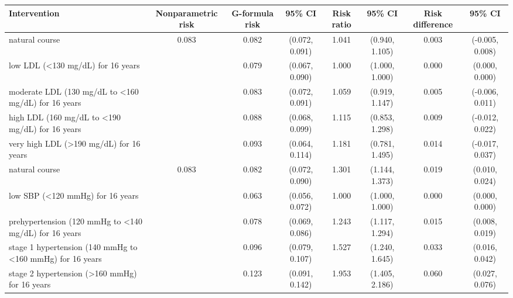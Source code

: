 
\begin{tabular}{lccccccc}
\toprule
Intervention & Nonparametric risk & G-formula risk & 95\% CI & Risk ratio & 95\% CI & Risk difference & 95\% CI\\
\midrule
natural course & 0.083 & 0.082 & (0.072, 0.091) & 1.041 & (0.940, 1.105) & 0.003 & (-0.005, 0.008)\\
low LDL (<130 mg/dL) for 16 years &  & 0.079 & (0.067, 0.090) & 1.000 & (1.000, 1.000) & 0.000 & (0.000, 0.000)\\
moderate LDL (130 mg/dL to <160 mg/dL) for 16 years &  & 0.083 & (0.072, 0.091) & 1.059 & (0.919, 1.147) & 0.005 & (-0.006, 0.011)\\
high LDL (160 mg/dL to <190 mg/dL) for 16 years &  & 0.088 & (0.068, 0.099) & 1.115 & (0.853, 1.298) & 0.009 & (-0.012, 0.022)\\
very high LDL (>190 mg/dL) for 16 years &  & 0.093 & (0.064, 0.114) & 1.181 & (0.781, 1.495) & 0.014 & (-0.017, 0.037)\\
\addlinespace
natural course & 0.083 & 0.082 & (0.072, 0.090) & 1.301 & (1.144, 1.373) & 0.019 & (0.010, 0.024)\\
low SBP (<120 mmHg) for 16 years &  & 0.063 & (0.056, 0.072) & 1.000 & (1.000, 1.000) & 0.000 & (0.000, 0.000)\\
prehypertension (120 mmHg to <140 mg/dL) for 16 years &  & 0.078 & (0.069, 0.086) & 1.243 & (1.117, 1.294) & 0.015 & (0.008, 0.019)\\
stage 1 hypertension (140 mmHg to <160 mmHg) for 16 years &  & 0.096 & (0.079, 0.107) & 1.527 & (1.240, 1.645) & 0.033 & (0.016, 0.042)\\
stage 2 hypertension (>160 mmHg) for 16 years &  & 0.123 & (0.091, 0.142) & 1.953 & (1.405, 2.186) & 0.060 & (0.027, 0.076)\\
\bottomrule
\end{tabular}
